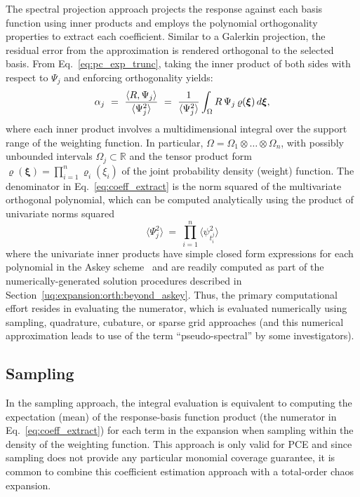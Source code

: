 The spectral projection approach
projects the response against each basis function using inner products
and employs the polynomial orthogonality properties to extract each
coefficient.  Similar to a Galerkin projection, the residual error
from the approximation is rendered orthogonal to the selected basis.
From Eq.~\ref{eq:pc_exp_trunc}, taking the inner product of both sides
with respect to $\Psi_j$ and enforcing orthogonality yields:
\begin{equation}
\alpha_j ~=~ \frac{\langle R, \Psi_j \rangle}{\langle \Psi^2_j \rangle}
~=~ {1\over {\langle \Psi^2_j \rangle}}
 \int_{\Omega} R\, \Psi_j\, \varrho(\boldsymbol{\xi}) \,d\boldsymbol{\xi},
\label{eq:coeff_extract}
\end{equation}
where each inner product involves a multidimensional integral over
the support range of the weighting function.  In particular, 
$\Omega = \Omega_1\otimes\dots\otimes\Omega_n$, with possibly
unbounded intervals $\Omega_j\subset\mathbb{R}$ and the tensor product 
form $\varrho(\boldsymbol{\xi}) = \prod_{i=1}^n \varrho_i(\xi_i)$ 
of the joint probability density (weight) function.  The denominator 
in Eq.~\ref{eq:coeff_extract} is the norm squared of the multivariate
orthogonal polynomial, which can be computed analytically using the
product of univariate norms squared
\begin{equation}
\langle \Psi^2_j \rangle ~=~ \prod_{i=1}^{n} \langle \psi_{t_i^j}^2 \rangle
\label{eq:norm_squared}
\end{equation}
where the univariate inner products have simple closed form
expressions for each polynomial in the Askey
scheme~\cite{abram_stegun} and are readily computed as part of the
numerically-generated solution procedures described in
Section~\ref{uq:expansion:orth:beyond_askey}. Thus, the primary
computational effort resides in evaluating the numerator, which is
evaluated numerically using sampling, quadrature, cubature, or sparse
grid approaches (and this numerical approximation leads to use of the
term ``pseudo-spectral'' by some investigators).


\subsection{Sampling} \label{uq:expansion:spectral_samp}

In the sampling approach, the integral evaluation is equivalent to
computing the expectation (mean) of the response-basis function
product (the numerator in Eq.~\ref{eq:coeff_extract}) for each term in
the expansion when sampling within the density of the weighting
function.  This approach is only valid for PCE and since sampling does
not provide any particular monomial coverage guarantee, it is common
to combine this coefficient estimation approach with a total-order
chaos expansion.

